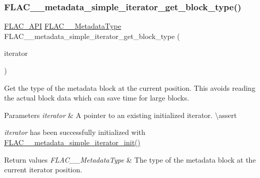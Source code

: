 \subsubsection{\texorpdfstring{FLAC\_\_metadata\_simple\_iterator\_get\_block\_type()}{FLAC\_\_metadata\_simple\_iterator\_get\_block\_type()}}
{\footnotesize\ttfamily \mbox{\hyperlink{group__flac__export_ga56ca07df8a23310707732b1c0007d6f5}{F\+L\+A\+C\+\_\+\+A\+PI}} \mbox{\hyperlink{group__flac__format_gac71714ba8ddbbd66d26bb78a427fac01}{F\+L\+A\+C\+\_\+\+\_\+\+Metadata\+Type}} F\+L\+A\+C\+\_\+\+\_\+metadata\+\_\+simple\+\_\+iterator\+\_\+get\+\_\+block\+\_\+type (\begin{DoxyParamCaption}\item[{const \mbox{\hyperlink{group__flac__metadata__level1_ga6accccddbb867dfc2eece9ee3ffecb3a}{F\+L\+A\+C\+\_\+\+\_\+\+Metadata\+\_\+\+Simple\+Iterator}} $\ast$}]{iterator }\end{DoxyParamCaption})}

Get the type of the metadata block at the current position. This avoids reading the actual block data which can save time for large blocks.


\begin{DoxyParams}{Parameters}
{\em iterator} & A pointer to an existing initialized iterator. \textbackslash{}assert 
\begin{DoxyCode}{1}
\end{DoxyCode}
 {\itshape iterator} has been successfully initialized with \mbox{\hyperlink{group__flac__metadata__level1_ga2a055cca4e6e06ae62517c8b0fa6e8a3}{F\+L\+A\+C\+\_\+\+\_\+metadata\+\_\+simple\+\_\+iterator\+\_\+init()}} \\
\hline
\end{DoxyParams}

\begin{DoxyRetVals}{Return values}
{\em F\+L\+A\+C\+\_\+\+\_\+\+Metadata\+Type} & The type of the metadata block at the current iterator position. \\
\hline
\end{DoxyRetVals}
\mbox{\label{group__flac__metadata__level1_ga2a055cca4e6e06ae62517c8b0fa6e8a3}} 
